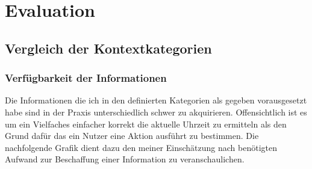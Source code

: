 \chapter{Evaluation}%
\label{cha:evaluation}



\section{Vergleich der Kontextkategorien} 
\subsection{Verfügbarkeit der Informationen}
Die Informationen die ich in den definierten Kategorien als gegeben vorausgesetzt habe sind in der Praxis unterschiedlich schwer zu akquirieren. Offensichtlich ist es um ein Vielfaches einfacher korrekt die aktuelle Uhrzeit zu ermitteln als den Grund dafür das ein Nutzer eine Aktion ausführt zu bestimmen. Die nachfolgende Grafik dient dazu den meiner Einschätzung nach benötigten Aufwand zur Beschaffung einer Information zu veranschaulichen.

